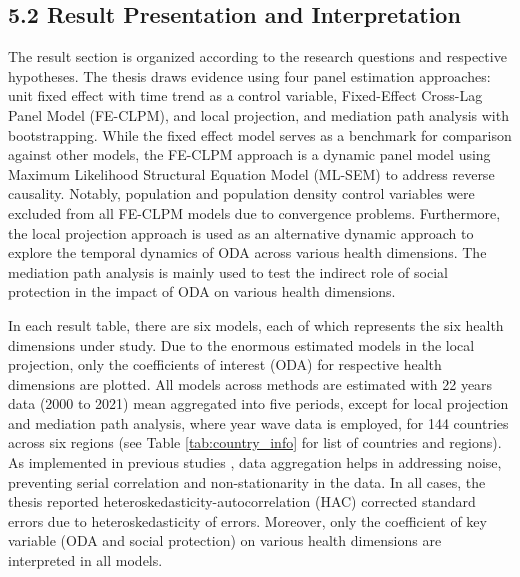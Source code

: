 \subsection*{5.2 Result Presentation and Interpretation}
The result section is organized according to the research questions and respective hypotheses. The thesis draws evidence using four panel estimation approaches: unit fixed effect with time trend as a control variable, Fixed-Effect Cross-Lag Panel Model (FE-CLPM), and local projection, and mediation path analysis with bootstrapping.  While the fixed effect model serves as a benchmark for comparison against other models, the FE-CLPM approach is a dynamic panel model using Maximum Likelihood Structural Equation Model (ML-SEM) to address reverse causality. Notably, population and population density control variables were excluded from all FE-CLPM models due to convergence problems. Furthermore, the local projection approach is used as an alternative dynamic approach to explore the temporal dynamics of ODA across various health dimensions. The mediation path analysis is mainly used to test the indirect role of social protection in the impact of ODA on various health dimensions. 


In each result table, there are six models, each of which represents the six health dimensions under study. Due to the enormous estimated models in the local projection, only the coefficients of interest (ODA) for respective health dimensions are plotted. All models across methods are estimated with 22 years data (2000 to 2021) mean aggregated into five periods, except for local projection and mediation path analysis, where year wave data is employed, for 144 countries across six regions (see Table \ref{tab:country_info} for list of countries and regions).  As implemented in previous studies \parencite[i.e.][]{yogo_health_2015, williamson_foreign_2008}, data aggregation helps in addressing noise, preventing serial correlation and non-stationarity in the data. In all cases, the thesis reported heteroskedasticity-autocorrelation (HAC) corrected standard errors due to heteroskedasticity of errors. Moreover, only the coefficient of key variable (ODA and social protection) on various health dimensions are interpreted in all models. 



